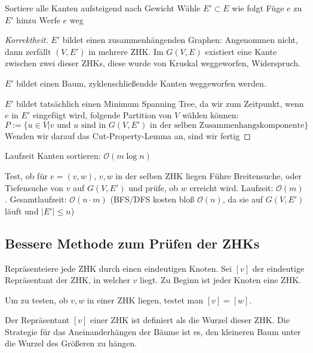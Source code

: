 \documentclass{mycourse}
\renewcommand{\O}{\mathcal{O}}
\begin{document}
\begin{alg}
	\begin{algorithmic}
		\State Sortiere alle Kanten aufsteigend nach Gewicht
		\State Wähle $E' \subset E$ wie folgt
				\State Füge $e$ zu $E'$ hinzu
			\Else
				\State Werfe $e$ weg
			\EndIf
		\EndFor
	\end{algorithmic}

	\begin{proof}[Korrektheit]
		$E'$ bildet einen zusammenhängenden Graphen:
		Angenommen nicht, dann zerfällt $(V,E')$ in mehrere ZHK.
		Im $G(V,E)$ existiert eine Kante zwischen zwei dieser ZHKs, diese wurde von Kruskal weggeworfen, Widerspruch.

		$E'$ bildet einen Baum, zyklenschließendde Kanten weggeworfen werden.

		$E'$ bildet tatsächlich einen Minimum Spanning Tree, da wir zum Zeitpunkt, wenn $e$ in $E'$ eingefügt wird, folgende Partition von $V$ wählen können:
		\[
			P := \{u \in V \Big| \text{$v$ und $u$ sind in $G(V,E')$ in der selben Zusammenhangskomponente}\}
		\]
		Wenden wir darauf das Cut-Property-Lemma an, sind wir fertig
	\end{proof}

	\begin{seg}{Laufzeit}
		Kanten sortieren: $\O(m\log n)$		
	\end{seg}
	\begin{seg}{Test, ob für $e=(v,w)$, $v,w$ in der selben ZHK liegen}
		Führe Breitensuche, oder Tiefensuche von $v$ auf $G(V,E')$ und prüfe, ob $w$ erreicht wird.
		Laufzeit: $\O(m)$.
		Gesamtlaufzeit: $\O(n\cdot m)$ (BFS/DFS kosten bloß $\O(n)$, da sie auf $G(V,E')$ läuft und $|E'|\le n$)
	\end{seg}
\end{alg}

\subsection{Bessere Methode zum Prüfen der ZHKs}
Repräsenteiere jede ZHK durch einen eindeutigen Knoten.
Sei $[v]$ der eindeutige Repräsentant der ZHK, in welcher $v$ liegt.
Zu Beginn ist jeder Knoten eine ZHK.

Um zu testen, ob $v,w$ in einer ZHK liegen, testet man $[v]=[w]$.

Der Repräsentant $[v]$ einer ZHK ist definiert als die Wurzel dieser ZHK.
Die Strategie für das Aneinanderhängen der Bäume ist es, den kleineren Baum unter die Wurzel des Größeren zu hängen.	
\end{document}
